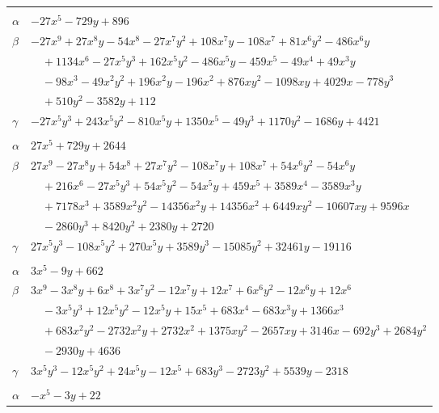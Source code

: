 \documentclass[11pt]{article}
\begin{document}
\begin{longtable}{@{}ll@{}}
\addlinespace[3pt]
\multicolumn{2}{@{}l}{$\{i,j\}=\{14,28\}$, $k_{ij}=2^{5}\cdot 5\cdot 7$}\\
$\alpha$ & $-27x^{5}-729y+896$\\
$\beta$ & $-27x^{9}+27x^{8}y-54x^{8}-27x^{7}y^{2}+108x^{7}y-108x^{7}+81x^{6}y^{2}-486x^{6}y$\\
 & $\quad +1134x^{6}-27x^{5}y^{3}+162x^{5}y^{2}-486x^{5}y-459x^{5}-49x^{4}+49x^{3}y$\\
 & $\quad -98x^{3}-49x^{2}y^{2}+196x^{2}y-196x^{2}+876xy^{2}-1098xy+4029x-778y^{3}$\\
 & $\quad +510y^{2}-3582y+112$\\
$\gamma$ & $-27x^{5}y^{3}+243x^{5}y^{2}-810x^{5}y+1350x^{5}-49y^{3}+1170y^{2}-1686y+4421$\\
\addlinespace[3pt]
\multicolumn{2}{@{}l}{$\{i,j\}=\{14,38\}$, $k_{ij}=2^{6}\cdot 5^{2}\cdot 17$}\\
$\alpha$ & $27x^{5}+729y+2644$\\
$\beta$ & $27x^{9}-27x^{8}y+54x^{8}+27x^{7}y^{2}-108x^{7}y+108x^{7}+54x^{6}y^{2}-54x^{6}y$\\
 & $\quad +216x^{6}-27x^{5}y^{3}+54x^{5}y^{2}-54x^{5}y+459x^{5}+3589x^{4}-3589x^{3}y$\\
 & $\quad +7178x^{3}+3589x^{2}y^{2}-14356x^{2}y+14356x^{2}+6449xy^{2}-10607xy+9596x$\\
 & $\quad -2860y^{3}+8420y^{2}+2380y+2720$\\
$\gamma$ & $27x^{5}y^{3}-108x^{5}y^{2}+270x^{5}y+3589y^{3}-15085y^{2}+32461y-19116$\\
\addlinespace[3pt]
\multicolumn{2}{@{}l}{$\{i,j\}=\{14,39\}$, $k_{ij}=2^{6}\cdot 7\cdot 17$}\\
$\alpha$ & $3x^{5}-9y+662$\\
$\beta$ & $3x^{9}-3x^{8}y+6x^{8}+3x^{7}y^{2}-12x^{7}y+12x^{7}+6x^{6}y^{2}-12x^{6}y+12x^{6}$\\
 & $\quad -3x^{5}y^{3}+12x^{5}y^{2}-12x^{5}y+15x^{5}+683x^{4}-683x^{3}y+1366x^{3}$\\
 & $\quad +683x^{2}y^{2}-2732x^{2}y+2732x^{2}+1375xy^{2}-2657xy+3146x-692y^{3}+2684y^{2}$\\
 & $\quad -2930y+4636$\\
$\gamma$ & $3x^{5}y^{3}-12x^{5}y^{2}+24x^{5}y-12x^{5}+683y^{3}-2723y^{2}+5539y-2318$\\
\addlinespace[3pt]
\multicolumn{2}{@{}l}{$\{i,j\}=\{14,40\}$, $k_{ij}=2^{2}\cdot 3\cdot 13$}\\
$\alpha$ & $-x^{5}-3y+22$\\

\end{longtable}
\end{document}
